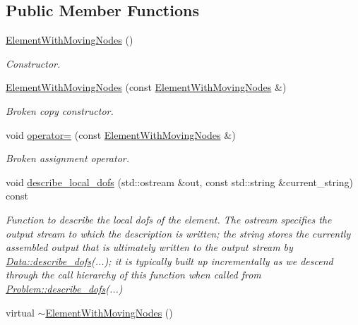 \subsection*{Public Member Functions}
\begin{DoxyCompactItemize}
\item 
\hyperlink{classoomph_1_1ElementWithMovingNodes_a498ce4d6bc4a92f1baa6e10aba3abe12}{Element\+With\+Moving\+Nodes} ()
\begin{DoxyCompactList}\small\item\em Constructor. \end{DoxyCompactList}\item 
\hyperlink{classoomph_1_1ElementWithMovingNodes_a6b8b065876eeb3e896c4d8108e293942}{Element\+With\+Moving\+Nodes} (const \hyperlink{classoomph_1_1ElementWithMovingNodes}{Element\+With\+Moving\+Nodes} \&)
\begin{DoxyCompactList}\small\item\em Broken copy constructor. \end{DoxyCompactList}\item 
void \hyperlink{classoomph_1_1ElementWithMovingNodes_a0037d698fed48c069c26e869b3fa8d49}{operator=} (const \hyperlink{classoomph_1_1ElementWithMovingNodes}{Element\+With\+Moving\+Nodes} \&)
\begin{DoxyCompactList}\small\item\em Broken assignment operator. \end{DoxyCompactList}\item 
void \hyperlink{classoomph_1_1ElementWithMovingNodes_ab80f172afa65872255959c1af3fb7809}{describe\+\_\+local\+\_\+dofs} (std\+::ostream \&out, const std\+::string \&current\+\_\+string) const
\begin{DoxyCompactList}\small\item\em Function to describe the local dofs of the element. The ostream specifies the output stream to which the description is written; the string stores the currently assembled output that is ultimately written to the output stream by \hyperlink{classoomph_1_1Data_a2dae16e2dcff9a40029f834c83364df5}{Data\+::describe\+\_\+dofs}(...); it is typically built up incrementally as we descend through the call hierarchy of this function when called from \hyperlink{classoomph_1_1Problem_abc103804eb319ae0b3d43870cc3e1eaf}{Problem\+::describe\+\_\+dofs}(...) \end{DoxyCompactList}\item 
virtual \hyperlink{classoomph_1_1ElementWithMovingNodes_a418b966b3bc0322da2e26273a3b737cb}{$\sim$\+Element\+With\+Moving\+Nodes} ()

\end{DoxyCompactItemize}
